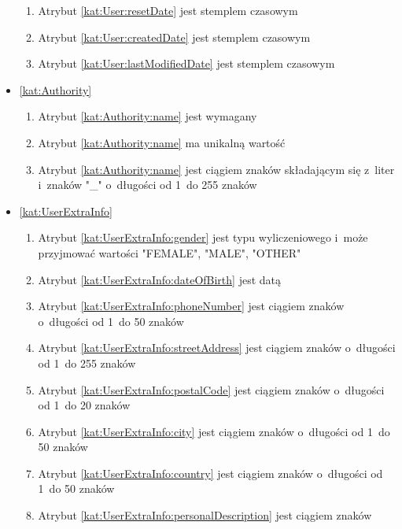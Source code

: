 \begin{itemize}[label={\textbf{Ograniczenia dla}}, wide, labelwidth=!, labelindent=0pt]
\begin{enumerate}[label={\textbf{OGR/0/\protect\twodigits{\arabic{enumi}}}}, wide, labelwidth=!, align=left, leftmargin=3cm]
        \item Atrybut \ref{kat:User:resetDate} jest stemplem czasowym
        \item Atrybut \ref{kat:User:createdDate} jest stemplem czasowym
        \item Atrybut \ref{kat:User:lastModifiedDate} jest stemplem czasowym
    \end{enumerate}
    \item\ref{kat:Authority}\mynobreakpar
    \begin{enumerate}[label={\textbf{OGR/0/\protect\twodigits{\arabic{enumi}}}}, wide, labelwidth=!, align=left, leftmargin=3cm, resume]
        \item Atrybut \ref{kat:Authority:name} jest wymagany
        \item Atrybut \ref{kat:Authority:name} ma unikalną wartość
        \item Atrybut \ref{kat:Authority:name} jest ciągiem znaków składającym się z~liter i~znaków "\_" o~długości od 1~do 255 znaków
    \end{enumerate}
    \item\ref{kat:UserExtraInfo}\mynobreakpar
    \begin{enumerate}[label={\textbf{OGR/0/\protect\twodigits{\arabic{enumi}}}}, wide, labelwidth=!, align=left, leftmargin=3cm, resume]
        \item Atrybut \ref{kat:UserExtraInfo:gender} jest typu wyliczeniowego i~może przyjmować wartości "FEMALE", "MALE", "OTHER"
        \item Atrybut \ref{kat:UserExtraInfo:dateOfBirth} jest datą
        \item Atrybut \ref{kat:UserExtraInfo:phoneNumber} jest ciągiem znaków o~długości od 1~do 50 znaków
        \item Atrybut \ref{kat:UserExtraInfo:streetAddress} jest ciągiem znaków o~długości od 1~do 255 znaków
        \item Atrybut \ref{kat:UserExtraInfo:postalCode} jest ciągiem znaków o~długości od 1~do 20 znaków
        \item Atrybut \ref{kat:UserExtraInfo:city} jest ciągiem znaków o~długości od 1~do 50 znaków
        \item Atrybut \ref{kat:UserExtraInfo:country} jest ciągiem znaków o~długości od 1~do 50 znaków
        \item Atrybut \ref{kat:UserExtraInfo:personalDescription} jest ciągiem znaków
    \end{enumerate}


\end{itemize}
